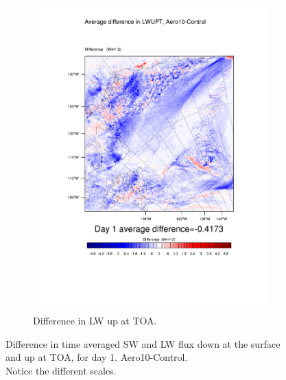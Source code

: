 \begin{figure}
\begin{subfigure}{0.48\textwidth}
		\includegraphics[width=\textwidth]{results/aero10/diff_Aero10_LWUPT_Day1.pdf}
		\caption{Difference in LW up at TOA.}
		\label{subfig:lwup_r3Day1}
	\end{subfigure}
	\caption{Difference in time averaged SW and LW flux down at the surface and up at TOA, for day 1. Aero10-Control.\\Notice the different scales.}
	\label{fig:radiation_r3Day1}
\end{figure}

